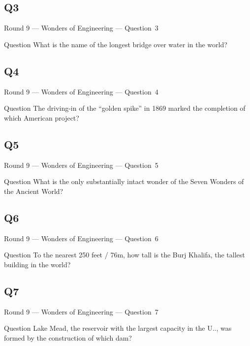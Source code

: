 \documentclass[11pt]{beamer}
\begin{document}
\subsection*{Q3}
\begin{frame}[t]{Round 9 --- Wonders of Engineering --- \mbox{Question 3}}
    \vspace{-0.5em}
    \begin{block}{Question}
        What is the name of the longest bridge over water in the world?
    \end{block}
\end{frame}
\subsection*{Q4}
\begin{frame}[t]{Round 9 --- Wonders of Engineering --- \mbox{Question 4}}
    \vspace{-0.5em}
    \begin{block}{Question}
        The driving-in of the ``golden spike'' in 1869 marked the completion of which American project?
    \end{block}
\end{frame}
\subsection*{Q5}
\begin{frame}[t]{Round 9 --- Wonders of Engineering --- \mbox{Question 5}}
    \vspace{-0.5em}
    \begin{block}{Question}
        What is the only substantially intact wonder of the Seven Wonders of the Ancient World?
    \end{block}
\end{frame}
\subsection*{Q6}
\begin{frame}[t]{Round 9 --- Wonders of Engineering --- \mbox{Question 6}}
    \vspace{-0.5em}
    \begin{block}{Question}
        To the nearest 250 feet / 76m, how tall is the Burj Khalifa, the tallest building in the world?
    \end{block}
\end{frame}
\subsection*{Q7}
\begin{frame}[t]{Round 9 --- Wonders of Engineering --- \mbox{Question 7}}
    \vspace{-0.5em}
    \begin{block}{Question}
        Lake Mead, the reservoir with the largest capacity in the U.\@S.\@, was formed by the construction of which dam?
    \end{block}
\end{frame}
\end{document}
